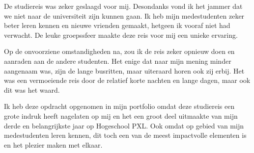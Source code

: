 De studiereis was zeker geslaagd voor mij. Desondanks vond ik het jammer dat we niet naar de universiteit zijn kunnen gaan. Ik heb mijn medestudenten zeker beter leren kennen en nieuwe vrienden gemaakt, hetgeen ik vooraf niet had verwacht. De leuke groepssfeer maakte deze reis voor mij een unieke ervaring.

Op de onvoorziene omstandigheden na, zou ik de reis zeker opnieuw doen en aanraden aan de andere studenten. Het enige dat naar mijn mening minder aangenaam was, zijn de lange busritten, maar uiteraard horen ook zij erbij. Het was een vermoeiende reis door de relatief korte nachten en lange dagen, maar ook dit was het waard.

Ik heb deze opdracht opgenomen in mijn portfolio omdat deze studiereis een grote indruk heeft nagelaten op mij en het een groot deel uitmaakte van mijn derde en belangrijkste jaar op Hogeschool PXL. Ook omdat op gebied van mijn medestudenten leren kennen, dit toch een van de meest impactvolle elementen is en het plezier maken met elkaar.

